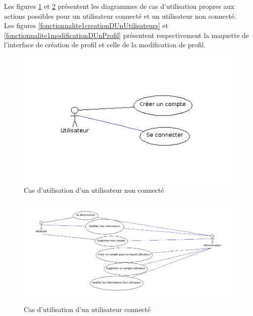 Les figures \ref{utilisateurNonConnecte} et \ref{utilisateurConnecte} présentent les diagrammes de cas d'utilisation propres aux actions possibles pour un utilisateur connecté et un utilisateur non connecté.\\
Les figures \ref{fonctionnalite1creationDUnUtilisateurs}  et \ref{fonctionnalite1modificationDUnProfil} présentent respectivement la maquette de l'interface de création de profil et celle de la modification de profil. \\
\begin{figure}[H]
	\centering
	\includegraphics[scale=0.4]{images/casDUtilisation/fonctionnalite1UtilisateurNonConnecte.png}
	 \caption{Cas d'utilisation  d'un utilisateur non connecté}
	 \label{utilisateurNonConnecte}
\end{figure}

\begin{figure}[H]
	\centering
	\includegraphics[scale=0.4]{images/casDUtilisation/fonctionnalite1UtilisateurConnecte.png}
	 \caption{Cas d'utilisation  d'un utilisateur connecté}
	 \label{utilisateurConnecte}

\end{figure}


